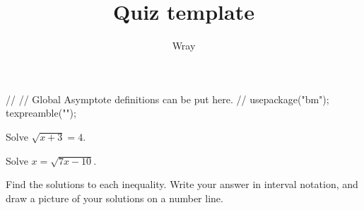 \documentclass[addpoints, 12pt]{exam}
\title{Quiz template}
\author{Wray}
\begin{document}
\begin{asydef}
//
// Global Asymptote definitions can be put here.
//
usepackage("bm");
texpreamble("\def\V#1{\bm{#1}}");
\end{asydef}



\bigskip

             
\bigskip
\bigskip

\smallskip

\begin{questions}

\question[3]
Solve $\sqrt{x+3} = 4$.


\question[5]
Solve $x = \sqrt{7x - 10}$.


\newpage

\question
Find the solutions to each inequality.  Write your answer in interval notation, and draw a picture of your solutions on a number line.


\end{questions}
\end{document}
